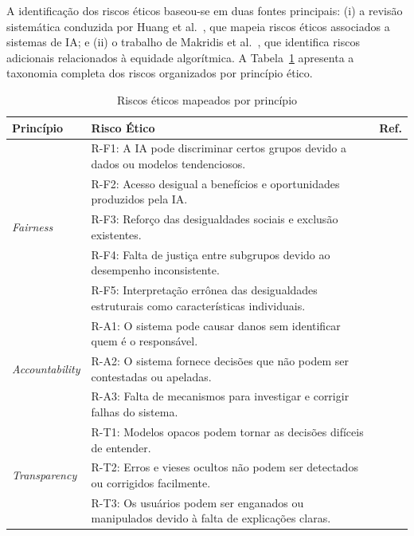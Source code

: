 A identificação dos riscos éticos baseou-se em duas fontes principais: (i) a revisão sistemática conduzida por Huang et al.~\cite{Huang2023}, que mapeia riscos éticos associados a sistemas de IA; e (ii) o trabalho de Makridis et al.~\cite{Makridis2024}, que identifica riscos adicionais relacionados à equidade algorítmica. A Tabela~\ref{tab:riscos_mapeados} apresenta a taxonomia completa dos riscos organizados por princípio ético.

\begin{table}[htbp]
\centering
\caption{Riscos éticos mapeados por princípio}
\label{tab:riscos_mapeados}
\footnotesize
\begin{tabular}{|p{2.3cm}|p{10cm}|c|}
\hline
\textbf{Princípio} & \textbf{Risco Ético} & \textbf{Ref.} \\ \hline
\multirow{5}{*}{\textit{Fairness}} 
    & R-F1: A IA pode discriminar certos grupos devido a dados ou modelos tendenciosos. & \cite{Huang2023} \\ \cline{2-3}
    & R-F2: Acesso desigual a benefícios e oportunidades produzidos pela IA. & \cite{Huang2023} \\ \cline{2-3}
    & R-F3: Reforço das desigualdades sociais e exclusão existentes. & \cite{Huang2023} \\ \cline{2-3}
    & R-F4: Falta de justiça entre subgrupos devido ao desempenho inconsistente. & \cite{Makridis2024} \\ \cline{2-3}
    & R-F5: Interpretação errônea das desigualdades estruturais como características individuais. & \cite{Makridis2024} \\ \hline
\multirow{3}{*}{\textit{Accountability}} 
    & R-A1: O sistema pode causar danos sem identificar quem é o responsável. & \cite{Huang2023} \\ \cline{2-3}
    & R-A2: O sistema fornece decisões que não podem ser contestadas ou apeladas. & \cite{Huang2023} \\ \cline{2-3}
    & R-A3: Falta de mecanismos para investigar e corrigir falhas do sistema. & \cite{Huang2023} \\ \hline
\multirow{3}{*}{\textit{Transparency}} 
    & R-T1: Modelos opacos podem tornar as decisões difíceis de entender. & \cite{Huang2023} \\ \cline{2-3}
    & R-T2: Erros e vieses ocultos não podem ser detectados ou corrigidos facilmente. & \cite{Huang2023} \\ \cline{2-3}
    & R-T3: Os usuários podem ser enganados ou manipulados devido à falta de explicações claras. & \cite{Huang2023} \\ \hline
\end{tabular}
\end{table}

